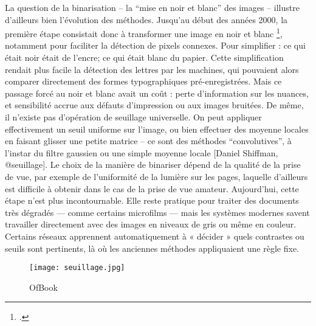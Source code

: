La question de la binarisation -- la \enquote{mise en noir et blanc} des images -- illustre d'ailleurs bien l’évolution des méthodes. Jusqu'au début des années 2000, la première étape consistait donc à transformer une image en noir et blanc \footcite[][]{graves}, notamment pour faciliter la détection de pixels connexes. Pour simplifier : ce qui était noir était de l'encre; ce qui était blanc du papier. Cette simplification rendait plus facile la détection des lettres par les machines, qui pouvaient alors comparer directement des formes typographiques pré-enregistrées. Mais ce passage forcé au noir et blanc avait un coût : perte d’information sur les nuances, et sensibilité accrue aux défauts d’impression ou aux images bruitées. De même, il n'existe pas d'opération de seuillage universelle. On peut appliquer effectivement un seuil uniforme sur l'image, ou bien effectuer des moyenne locales en faisant glisser une petite matrice -- ce sont des méthodes \enquote{convolutives}, à l'instar du filtre gaussien ou une simple moyenne locale [Daniel Shiffman, @seuillage]. Le choix de la manière de binariser dépend de la qualité de la prise de vue, par exemple de l'uniformité de la lumière sur les pages, laquelle d'ailleurs est difficile à obtenir dans le cas de la prise de vue amateur. Aujourd’hui, cette étape n’est plus incontournable. Elle reste pratique pour traiter des documents très dégradés — comme certains microfilms — mais les systèmes modernes savent travailler directement avec des images en niveaux de gris ou même en couleur. Certains réseaux apprennent automatiquement à « décider » quels contrastes ou seuils sont pertinents, là où les anciennes méthodes appliquaient une règle fixe.

\begin{figure}[htbp]
\centering
\texttt{[image: seuillage.jpg]}
\caption{OfBook}
\label{fig:seuillage}
\end{figure}


